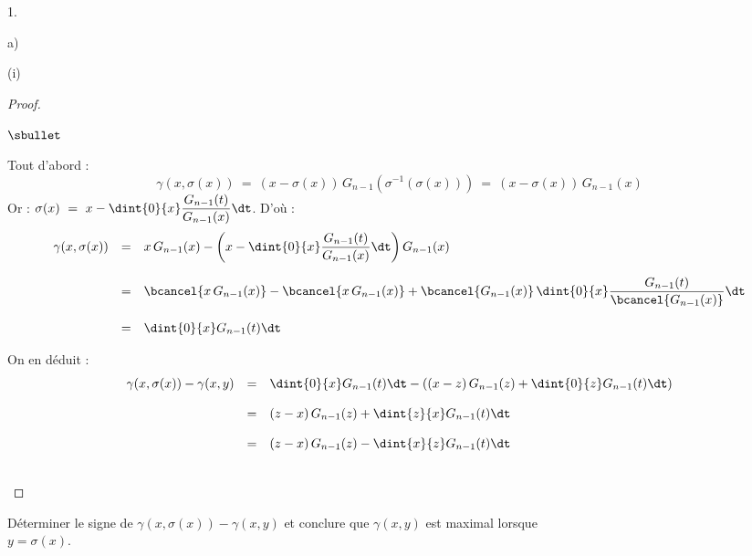 \documentclass[11pt]{article}%
\begin{document}
\begin{noliste}{1.}
\begin{noliste}{a)}
\begin{nonoliste}{(i)}
      \begin{proof}~
        \begin{noliste}{$\sbullet$}
	  \item Tout d'abord :
	  \[
	    \gamma(x, \sigma(x)) \ = \ (x - \sigma(x)) \, G_{n-1}(
	    \sigma^{-1}(\sigma(x))) \ = \ (x- \sigma(x)) \, G_{n-1}(x)
	  \]
	  Or : $\sigma(x) \ = \ x - \dint{0}{x} \dfrac{G_{n-1}(t)}
	  {G_{n-1}(x)} \dt$. D'où :
	  \[
	    \begin{array}{rcl}
	      \gamma(x,\sigma(x)) & = & x \, G_{n-1}(x) - \left(x - 
	      \dint{0}{x}
	      \dfrac{G_{n-1}(t)}{G_{n-1}(x)} \dt\right) G_{n-1}(x)
	      \\[.6cm]
	      & = & \bcancel{x \, G_{n-1}(x)} - \bcancel{x \, G_{n-1}(x)} 
	      + 
	      \bcancel{G_{n-1}(x)} \, \dint{0}{x} \dfrac{G_{n-1}(t)}
	      {\bcancel{G_{n-1}(x)}} \dt
	      \\[.6cm]
	      & = & \dint{0}{x} G_{n-1}(t) \dt
	    \end{array}
	  \]
	  
	  \item On en déduit :
	  \[
	    \begin{array}{rcl}
	      \gamma(x, \sigma(x)) - \gamma(x,y) & = & 
	      \dint{0}{x} G_{n-1}(t) \dt - \left( (x-z) \, G_{n-1}(z)
	      + \dint{0}{z} G_{n-1}(t) \dt\right)
	      \\[.4cm]
	      & = & (z-x) \, G_{n-1}(z) + \dint{z}{x} G_{n-1}(t) \dt
	      \\[.4cm]
	      & = & (z-x) \, G_{n-1}(z) - \dint{x}{z} G_{n-1}(t) \dt
	    \end{array}
	  \]
        \end{noliste}
        ~\\[-1cm]
      \end{proof}
      
      

      
      \item Déterminer le signe de $\gamma(x, \sigma(x)) - 
      \gamma(x,y)$ et conclure que $\gamma(x,y)$ est maximal lorsque\\ 
      $y = \sigma(x)$.
      

\end{nonoliste}
\end{noliste}
\end{noliste}
\end{document}
